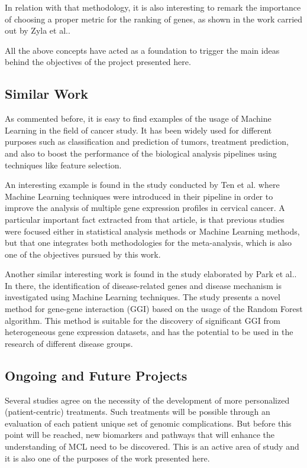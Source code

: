In relation with that methodology, it is also interesting to remark the importance of choosing a proper metric for the ranking of genes, as shown in the work carried out by Zyla et al.\cite{Zyla2017}.

All the above concepts have acted as a foundation to trigger the main ideas behind the objectives of the project presented here.

\subsection{Similar Work}

As commented before, it is easy to find examples of the usage of Machine Learning in the field of cancer study. It has been widely used for different purposes such as classification\cite{Chuang2007} and prediction of tumors, treatment prediction, and also to boost the performance of the biological analysis pipelines using techniques like feature selection\cite{SINGH201552}\cite{Bashiri2017}.

An interesting example is found in the study conducted by Ten et al.\cite{Tan2018} where Machine Learning techniques were introduced in their pipeline in order to improve the analysis of multiple gene expression profiles in cervical cancer.
A particular important fact extracted from that article, is that previous studies were focused either in statistical analysis methods or Machine Learning methods, but that one integrates both methodologies for the meta-analysis, which is also one of the objectives pursued by this work.

Another similar interesting work is found in the study elaborated by Park et al.\cite{Park2018}. In there, the identification of disease-related genes and disease mechanism is investigated using Machine Learning techniques. The study presents a novel method for gene-gene interaction (GGI) based on the usage of the Random Forest algorithm. This method is suitable for the discovery of significant GGI from heterogeneous gene expression datasets, and has the potential to be used in the research of different disease groups.

\subsection{Ongoing and Future Projects}

Several studies\cite{Inamdar2016}\cite{Steiner2018}\cite{Schieber2018}\cite{Dreyling2016} agree on the necessity of the development of more personalized (patient-centric) treatments. Such treatments will be possible through an evaluation of each patient unique set of genomic complications. But before this point will be reached, new biomarkers and pathways that will enhance the understanding of MCL need to be discovered. This is an active area of study and it is also one of the purposes of the work presented here.

